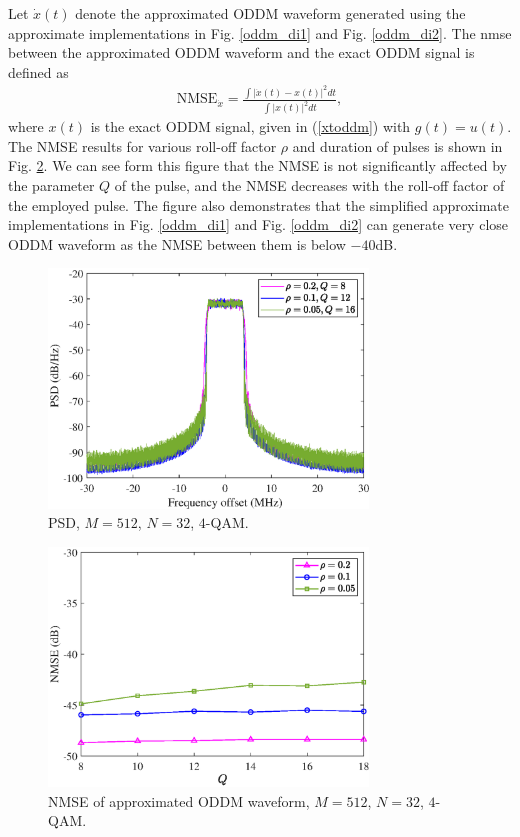 \documentclass[journal]{IEEEtran}
\begin{document}
{Let $\dot x(t)$ denote the approximated ODDM waveform generated using the approximate implementations in Fig. \ref{oddm_di1} and Fig.
\ref{oddm_di2}. The \ac{nmse} between the approximated ODDM waveform and the exact ODDM signal is defined as
\begin{align}
  \textrm{NMSE}_{\dot x}=\frac{\int |\dot x(t)-x(t)|^2 dt}{\int |x(t)|^2 dt},
\end{align}
where $x(t)$ is the exact ODDM signal, given in (\ref{xtoddm}) with $g(t)=u(t)$.
The NMSE results for various roll-off factor $\rho$ and duration of pulses is shown in Fig. \ref{xt_appro_nmse}.  We can see form this figure that the NMSE is not significantly affected by the parameter $Q$ of the pulse, and the NMSE decreases with the roll-off factor of the employed pulse. The figure also demonstrates that the simplified approximate implementations in Fig. \ref{oddm_di1} and Fig.
\ref{oddm_di2} can generate very close ODDM waveform as the NMSE between them is below $-40$dB.

\begin{figure}
  \centering
  \includegraphics[width=8.5cm]{oddm_psd}
  \caption{PSD, $M=512$, $N=32$, $4$-QAM.}
  \label{oddm_psd}
\end{figure}


\begin{figure}
  \centering
  \includegraphics[width=8.5cm]{xt_appro_nmse}
  \caption{NMSE of approximated ODDM waveform, $M=512$, $N=32$, $4$-QAM.}
  \label{xt_appro_nmse}
\end{figure}


}
\end{document}
